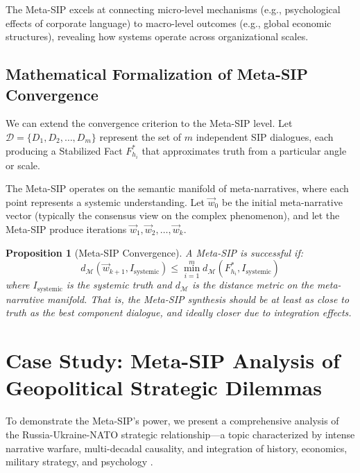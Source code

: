 \documentclass[11pt,a4paper]{article}
\newtheorem{proposition}{Proposition}[section]
\begin{document}
\begin{small}
\begin{description}[style=nextline]
\item[\textbf{Scale Integration:}] The Meta-SIP excels at connecting micro-level mechanisms (e.g., psychological effects of corporate language) to macro-level outcomes (e.g., global economic structures), revealing how systems operate across organizational scales.
\end{description}

\subsection{Mathematical Formalization of Meta-SIP Convergence}

We can extend the convergence criterion to the Meta-SIP level. Let $\mathcal{D} = \{D_1, D_2, \ldots, D_m\}$ represent the set of $m$ independent SIP dialogues, each producing a Stabilized Fact $F_{h_i}^*$ that approximates truth from a particular angle or scale.

The Meta-SIP operates on the semantic manifold of meta-narratives, where each point represents a systemic understanding. Let $\vec{w}_0$ be the initial meta-narrative vector (typically the consensus view on the complex phenomenon), and let the Meta-SIP produce iterations $\vec{w}_1, \vec{w}_2, \ldots, \vec{w}_k$.

\begin{proposition}[Meta-SIP Convergence]
A Meta-SIP is successful if:
\begin{equation}
d_{\mathcal{M}}(\vec{w}_{k+1}, I_{\text{systemic}}) \leq \min_{i=1}^m d_{\mathcal{M}}(F_{h_i}^*, I_{\text{systemic}})
\label{eq:metasip_convergence}
\end{equation}
where $I_{\text{systemic}}$ is the systemic truth and $d_{\mathcal{M}}$ is the distance metric on the meta-narrative manifold. That is, the Meta-SIP synthesis should be at least as close to truth as the best component dialogue, and ideally closer due to integration effects.
\end{proposition}

\section{Case Study: Meta-SIP Analysis of Geopolitical Strategic Dilemmas}

To demonstrate the Meta-SIP's power, we present a comprehensive analysis of the Russia-Ukraine-NATO strategic relationship---a topic characterized by intense narrative warfare, multi-decadal causality, and integration of history, economics, military strategy, and psychology \citep{metasip_dialogue}.


\end{small}
\end{document}
